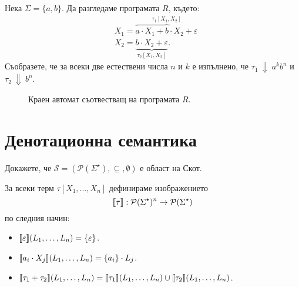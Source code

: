 \begin{example}
  Нека $\Sigma = \{a,b\}$. Да разгледаме програмата $R$, където:
  \begin{align*}
    & X_1 = \overbrace{a \cdot X_1 + b \cdot X_2 + \varepsilon}^{\tau_1[X_1,X_2]}\\
    & X_2 = \underbrace{b \cdot X_2 + \varepsilon}_{\tau_2[X_1,X_2]}.
  \end{align*}
  Съобразете, че за всеки две естествени числа $n$ и $k$ е изпълнено, че $\tau_1~\Downarrow~a^k b^n$ и $\tau_2~\Downarrow~b^n$.
  \begin{figure}[H]
      \centering
      \caption{Краен автомат съотвестващ на програмата $R$.}
    \end{figure}
\end{example}

\section{Денотационна семантика}

\begin{problem}
  Докажете, че $\mathcal{S} = (\mathcal{P}(\Sigma^\star), \subseteq, \emptyset)$ е област на Скот.
\end{problem}

За всеки терм $\tau[X_1,\dots,X_n]$ дефинираме изображението
\[\llbracket{\tau}\rrbracket: \mathcal{P}(\Sigma^\star)^n \to \mathcal{P}(\Sigma^\star)\]
 по следния начин:
\begin{itemize}
\item 
  $\llbracket{\varepsilon}\rrbracket(L_1,\dots,L_n) = \{\varepsilon\}$.
\item 
  $\llbracket{a_i \cdot X_j}\rrbracket(L_1,\dots,L_n) = \{a_i\} \cdot L_j$.
\item
  $\llbracket{\tau_1 + \tau_2}\rrbracket(L_1,\dots,L_n) = \llbracket{\tau_1}\rrbracket(L_1,\dots,L_n) \cup \llbracket{\tau_2}\rrbracket(L_1,\dots,L_n)$.
\end{itemize}

